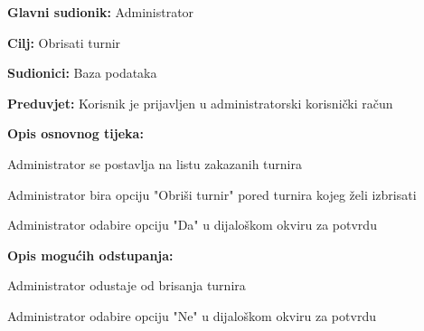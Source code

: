 		\noindent {}
		\begin{packed_item}
			
			\item \textbf{Glavni sudionik: } Administrator
			\item  \textbf{Cilj: } Obrisati turnir
			\item  \textbf{Sudionici: } Baza podataka
			\item  \textbf{Preduvjet: } Korisnik je prijavljen u administratorski korisnički račun
			\item  \textbf{Opis osnovnog tijeka:}
			
			\item[] \begin{packed_enum}
				
				\item Administrator se postavlja na listu zakazanih turnira
				\item Administrator bira opciju "Obriši turnir" pored turnira kojeg želi izbrisati
				\item Administrator odabire opciju "Da" u dijaloškom okviru za potvrdu
			\end{packed_enum}
			
			\item  \textbf{Opis mogućih odstupanja:}
			
			\item[] \begin{packed_item}
				
				\item[2.a] Administrator odustaje od brisanja turnira
				\item[] \begin{packed_enum}
					
					\item Administrator odabire opciju "Ne" u dijaloškom okviru za potvrdu
					
				\end{packed_enum}
			\end{packed_item}
			
		\end{packed_item}
	
